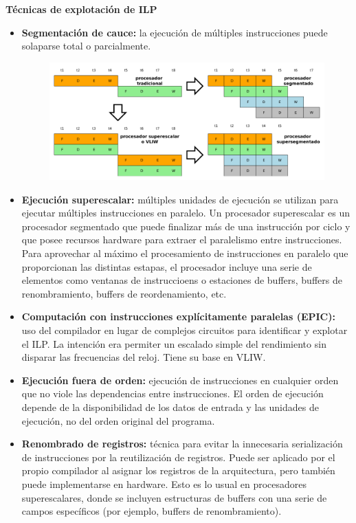 \documentclass{article}
\begin{document}
\textbf{Técnicas de explotación de ILP}
\begin{itemize}
\item \textbf{Segmentación de cauce:} la ejecución de múltiples instrucciones puede solaparse total o parcialmente. 

\begin{figure}[h]
\centering
\includegraphics[scale=1,width=\textwidth]{segmentacion.png}
\end{figure}

\item \textbf{Ejecución superescalar:} múltiples unidades de ejecución se utilizan para ejecutar múltiples instrucciones en paralelo. Un procesador superescalar es un procesador segmentado que puede finalizar más de una instrucción por ciclo y que posee recursos hardware para extraer el paralelismo entre instrucciones. Para aprovechar al máximo el procesamiento de instrucciones en paralelo que proporcionan las distintas estapas, el procesador incluye una serie de elementos como ventanas de instruccioens o estaciones de buffers, buffers de renombramiento, buffers de reordenamiento, etc.

\item \textbf{Computación con instrucciones explícitamente paralelas (EPIC):} uso del compilador en lugar de complejos circuitos para identificar y explotar el ILP. La intención era permiter un escalado simple del rendimiento sin disparar las frecuencias del reloj. Tiene su base en VLIW.

\item \textbf{Ejecución fuera de orden:} ejecución de instrucciones en cualquier orden que no viole las dependencias entre instrucciones. El orden de ejecución depende de la disponibilidad de los datos de entrada y las unidades de ejecución, no del orden original del programa.

\item \textbf{Renombrado de registros:} técnica para evitar la innecesaria serialización de instrucciones por la reutilización de registros. Puede ser aplicado por el propio compilador al asignar los registros de la arquitectura, pero también puede implementarse en hardware. Esto es lo usual en procesadores superescalares, donde se incluyen estructuras de buffers con una serie de campos específicos (por ejemplo, buffers de renombramiento).


\end{itemize}
\end{document}
